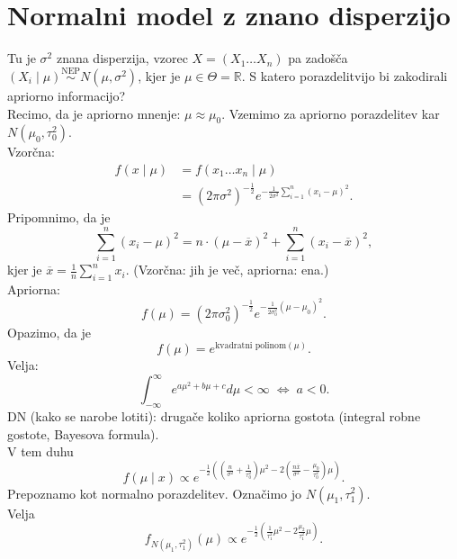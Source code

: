 \documentclass[a4paper, 12pt]{book}
\theoremstyle{definition}
\theoremstyle{remark}
\newcommand{\R}{\mathbb{R}}
\begin{document}
\section{Normalni model z znano disperzijo}

Tu je $\sigma^2$ znana disperzija, vzorec $X = (X_1 \dots X_n)$ pa zadošča \\
$(X_i \mid \mu) \stackrel{\text{NEP}}{\sim} N(\mu, \sigma^2)$, kjer je $\mu \in \Theta = \R$.
S katero porazdelitvijo bi zakodirali apriorno informacijo? \\
Recimo, da je apriorno mnenje: $\mu \approx \mu_0$.
Vzemimo za apriorno porazdelitev kar $N(\mu_0, \tau_0^2)$. \\
Vzorčna:
\begin{align*}
  f(x \mid \mu) &= f(x_1 \dots x_n \mid \mu) \\
  &= (2 \pi \sigma^2)^{-\frac{1}{2}} e^{-\frac{1}{2 \sigma^2} \sum_{i=1}^{n} (x_i - \mu)^2}.
\end{align*}
Pripomnimo, da je
\begin{equation*}
  \sum_{i=1}^{n} (x_i - \mu)^2 = n \cdot (\mu - \overline{x})^2 + \sum_{i=1}^{n} (x_i - \overline{x})^2,
\end{equation*}
kjer je $\overline{x} = \frac{1}{n} \sum_{i=1}^{n} x_i$.
(Vzorčna: jih je več, apriorna: ena.) \\
Apriorna:
\begin{equation*}
  f(\mu) = (2 \pi \sigma_0^2)^{-\frac{1}{2}} e^{-\frac{1}{2 \sigma_0^2} (\mu - \mu_0)^2}.
\end{equation*}
Opazimo, da je
\begin{equation*}
  f(\mu) = e^{\text{kvadratni polinom}(\mu)}.
\end{equation*}
Velja:
\begin{equation*}
  \int_{-\infty}^{\infty} e^{a \mu^2 + b \mu + c} d\mu < \infty \; \iff \; a < 0.
\end{equation*}
DN (kako se narobe lotiti): drugače koliko apriorna gostota (integral robne gostote, Bayesova formula). \\
V tem duhu
\begin{equation*}
  f(\mu \mid x) \propto e^{-\frac{1}{2} \left(\left(\frac{n}{\sigma^2} + \frac{1}{\tau_0^2}\right) \mu^2 -
  2 \left(\frac{n \overline{x}}{\sigma^2} - \frac{\mu_0}{\tau_0^2}\right) \mu\right)}.
\end{equation*}
Prepoznamo kot normalno porazdelitev.
Označimo jo $N(\mu_1, \tau_1^2)$. \\
Velja
\begin{equation*}
  f_{N(\mu_1, \tau_1^2)}(\mu) \propto e^{-\frac{1}{2} \left(\frac{1}{\tau_1^2} \mu^2 - 2 \frac{\mu_2}{\tau_1^2} \mu\right)}.
\end{equation*}
\end{document}
